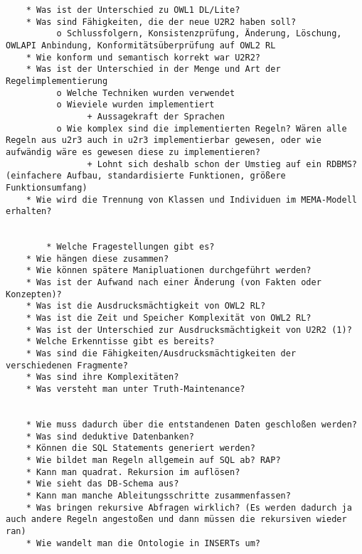 \begin{verbatim}
    * Was ist der Unterschied zu OWL1 DL/Lite?
    * Was sind Fähigkeiten, die der neue U2R2 haben soll?
          o Schlussfolgern, Konsistenzprüfung, Änderung, Löschung, OWLAPI Anbindung, Konformitätsüberprüfung auf OWL2 RL 
    * Wie konform und semantisch korrekt war U2R2?
    * Was ist der Unterschied in der Menge und Art der Regelimplementierung
          o Welche Techniken wurden verwendet
          o Wieviele wurden implementiert
                + Aussagekraft der Sprachen 
          o Wie komplex sind die implementierten Regeln? Wären alle Regeln aus u2r3 auch in u2r3 implementierbar gewesen, oder wie aufwändig wäre es gewesen diese zu implementieren?
                + Lohnt sich deshalb schon der Umstieg auf ein RDBMS? (einfachere Aufbau, standardisierte Funktionen, größere Funktionsumfang) 
    * Wie wird die Trennung von Klassen und Individuen im MEMA-Modell erhalten?
    
    
        * Welche Fragestellungen gibt es?
    * Wie hängen diese zusammen?
    * Wie können spätere Manipluationen durchgeführt werden?
    * Was ist der Aufwand nach einer Änderung (von Fakten oder Konzepten)?
    * Was ist die Ausdrucksmächtigkeit von OWL2 RL?
    * Was ist die Zeit und Speicher Komplexität von OWL2 RL?
    * Was ist der Unterschied zur Ausdrucksmächtigkeit von U2R2 (1)?
    * Welche Erkenntisse gibt es bereits?
    * Was sind die Fähigkeiten/Ausdrucksmächtigkeiten der verschiedenen Fragmente?
    * Was sind ihre Komplexitäten?
    * Was versteht man unter Truth-Maintenance? 


    * Wie muss dadurch über die entstandenen Daten geschloßen werden?
    * Was sind deduktive Datenbanken?
    * Können die SQL Statements generiert werden?
    * Wie bildet man Regeln allgemein auf SQL ab? RAP?
    * Kann man quadrat. Rekursion im auflösen?
    * Wie sieht das DB-Schema aus?
    * Kann man manche Ableitungsschritte zusammenfassen?
    * Was bringen rekursive Abfragen wirklich? (Es werden dadurch ja auch andere Regeln angestoßen und dann müssen die rekursiven wieder ran)
    * Wie wandelt man die Ontologie in INSERTs um? 
\end{verbatim}



    
     